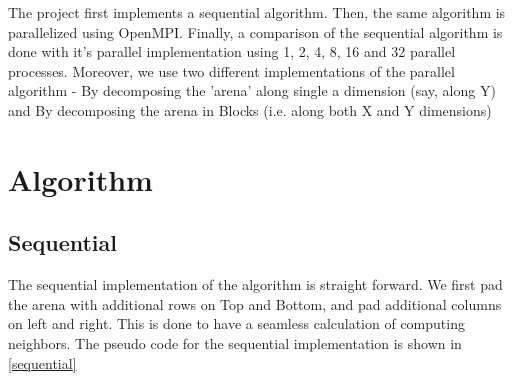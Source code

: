 \documentclass[a4paper, 10pt, conference]{IEEEtran}      %
\begin{document}
	The project first implements a sequential algorithm. Then, the same algorithm is parallelized using OpenMPI. Finally, a comparison of the sequential algorithm is done with it's parallel implementation using 1, 2, 4, 8, 16 and 32 parallel processes. Moreover, we use two different implementations of the parallel algorithm - By decomposing the 'arena' along single a dimension (say, along Y) and By decomposing the arena in Blocks (i.e. along both X and Y dimensions)
	\\
	
	\section{Algorithm}
	
	\subsection{Sequential}
	The sequential implementation of the algorithm is straight forward. We first pad the arena with additional rows on Top and Bottom, and pad additional columns on left and right. This is done to have a seamless calculation of computing neighbors. 
	The pseudo code for the sequential implementation is shown in \ref{sequential}
\end{document}

